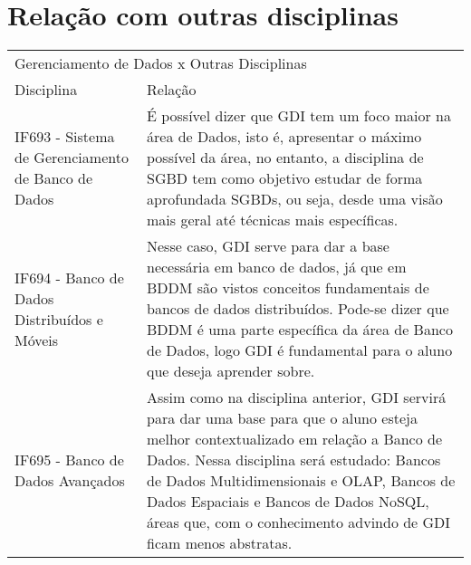 \documentclass[10pt]{article}
\begin{document}
\section{Relação com outras disciplinas}

\begin{table}[h]
 \centering
 {\renewcommand\arraystretch{1.25}
 \begin{tabular}{ l l }
  \cline{1-1}\cline{2-2}  
    \multicolumn{2}{|p{12cm}|}{Gerenciamento de Dados x Outras Disciplinas \centering }
  \\ 
  \cline{1-1}\cline{2-2}  
    \multicolumn{1}{|p{5cm}|}{Disciplina \centering } &
    \multicolumn{1}{p{7cm}|}{Relação \centering }
  \\ 
  \cline{1-1}\cline{2-2}  
    \multicolumn{1}{|p{5cm}|}{IF693 -  Sistema de Gerenciamento de Banco de Dados \centering } &
    \multicolumn{1}{p{7cm}|}{É possível dizer que GDI tem um foco maior na área de Dados, isto é, apresentar o máximo possível da área, no entanto, a disciplina de SGBD tem como objetivo estudar de forma aprofundada SGBDs, ou seja, desde uma visão mais geral até técnicas mais específicas.}
  \\ 
  \cline{1-1}\cline{2-2}  
    \multicolumn{1}{|p{5cm}|}{IF694 - Banco de Dados Distribuídos e Móveis \centering } &
    \multicolumn{1}{p{7cm}|}{Nesse caso, GDI serve para dar a base necessária em banco de dados, já que em BDDM são vistos conceitos fundamentais de bancos de dados distribuídos. Pode-se dizer que BDDM é uma parte específica da área de Banco de Dados, logo GDI é fundamental para o aluno que deseja aprender sobre. }
  \\
  \cline{1-1}\cline{2-2}  
    \multicolumn{1}{|p{5cm}|}{IF695 - Banco de Dados Avançados \centering } &
    \multicolumn{1}{p{7cm}|}{Assim como na disciplina anterior, GDI servirá para dar uma base para que o aluno esteja melhor contextualizado em relação a Banco de Dados. Nessa disciplina será estudado: Bancos de Dados Multidimensionais e OLAP, Bancos de Dados Espaciais e Bancos de Dados NoSQL, áreas que, com o conhecimento advindo de GDI ficam menos abstratas.}
  \\ 
  \hline
\end{tabular}}
\end{table}



\end{document}
